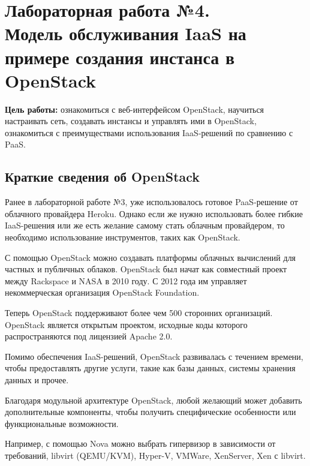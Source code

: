 \section[ЛР №4. Модель обслуживания IaaS, OpenStack]{Лабораторная работа №4. \\
Модель обслуживания IaaS на примере создания инстанса в OpenStack}

\textbf{Цель работы:} ознакомиться с веб-интерфейсом OpenStack, научиться настраивать сеть, создавать инстансы и управлять ими в OpenStack, ознакомиться с преимуществами использования IaaS-решений по сравнению с PaaS.

\subsection{Краткие сведения об OpenStack}

Ранее в лабораторной работе №3, уже использовалось готовое PaaS-решение от облачного провайдера Heroku.
Однако если же нужно использовать более гибкие IaaS-решения или же есть желание самому стать облачным провайдером, то необходимо использование инструментов, таких как OpenStack.

С помощью OpenStack можно создавать платформы облачных вычислений для частных и публичных облаков.
OpenStack был начат как совместный проект между Rackspace и NASA в 2010 году.
С 2012 года им управляет некоммерческая организация OpenStack Foundation.

Теперь OpenStack поддерживают более чем 500 сторонних организаций.
OpenStack является открытым проектом, исходные коды которого распространяются под лицензией Apache 2.0.

Помимо обеспечения IaaS-решений, OpenStack развивалась с течением времени, чтобы предоставлять другие услуги, такие как базы данных, системы хранения данных и прочее.

Благодаря модульной архитектуре OpenStack, любой желающий может добавить дополнительные компоненты, чтобы получить специфические особенности или функциональные возможности.

Например, с помощью Nova можно выбрать гипервизор в зависимости от требований, libvirt (QEMU/KVM), Hyper-V, VMWare, XenServer, Xen с libvirt.

